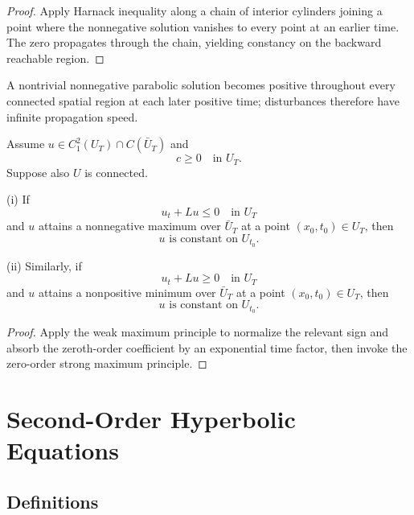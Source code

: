 \begin{proof}
\sketch Apply Harnack inequality along a chain of interior cylinders joining a point where the nonnegative solution vanishes to every point at an earlier time. The zero propagates through the chain, yielding constancy on the backward reachable region.
\end{proof}

\begin{remark}
\label{rem:parabolic-infinite-propagation-speed}
A nontrivial nonnegative parabolic solution becomes positive throughout every connected spatial region at each later positive time; disturbances therefore have infinite propagation speed.
\end{remark}

\begin{theorem}
\label{thm:parabolic-strong-maximum-principle-c-nonneg}
Assume $u \in C_1^2(U_T) \cap C(\bar{U}_T)$ and
\[
c \geq 0 \quad \text{in } U_T.
\]
Suppose also $U$ is connected.

(i) If
\[
u_t + Lu \leq 0 \quad \text{in } U_T
\]
and $u$ attains a nonnegative maximum over $\bar{U}_T$ at a point $(x_0, t_0) \in U_T$, then
\[
u \text{ is constant on } U_{t_0}.
\]

(ii) Similarly, if
\[
u_t + Lu \geq 0 \quad \text{in } U_T
\]
and $u$ attains a nonpositive minimum over $\bar{U}_T$ at a point $(x_0, t_0) \in U_T$, then
\[
u \text{ is constant on } U_{t_0}.
\]
\end{theorem}

\begin{proof}
\sketch Apply the weak maximum principle to normalize the relevant sign and absorb the zeroth-order coefficient by an exponential time factor, then invoke the zero-order strong maximum principle.
\end{proof}

\section{Second-Order Hyperbolic Equations}
\label{sec:second-order-hyperbolic-equations}

\subsection{Definitions}

